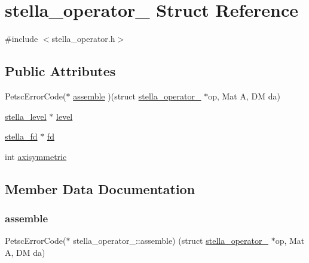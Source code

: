 \hypertarget{structstella__operator__}{}\section{stella\+\_\+operator\+\_\+ Struct Reference}
\label{structstella__operator__}


{\ttfamily \#include $<$stella\+\_\+operator.\+h$>$}

\subsection*{Public Attributes}
\begin{DoxyCompactItemize}
\item 
Petsc\+Error\+Code($\ast$ \mbox{\hyperlink{structstella__operator___ab943e5745cc7e69b823048738df22fbe}{assemble}} )(struct \mbox{\hyperlink{structstella__operator__}{stella\+\_\+operator\+\_\+}} $\ast$op, Mat A, DM da)
\item 
\mbox{\hyperlink{structstella__level}{stella\+\_\+level}} $\ast$ \mbox{\hyperlink{structstella__operator___a9077be12bc3bd23a0a06d617a010713f}{level}}
\item 
\mbox{\hyperlink{structstella__fd}{stella\+\_\+fd}} $\ast$ \mbox{\hyperlink{structstella__operator___ac5bf43c57b59a89df8b96a233c3978cc}{fd}}
\item 
int \mbox{\hyperlink{structstella__operator___a736dfc67cd63872aac66d5a227ef6d16}{axisymmetric}}
\end{DoxyCompactItemize}


\subsection{Member Data Documentation}
\mbox{\label{structstella__operator___ab943e5745cc7e69b823048738df22fbe}} 
\subsubsection{\texorpdfstring{assemble}{assemble}}
{\footnotesize\ttfamily Petsc\+Error\+Code($\ast$ stella\+\_\+operator\+\_\+\+::assemble) (struct \mbox{\hyperlink{structstella__operator__}{stella\+\_\+operator\+\_\+}} $\ast$op, Mat A, DM da)}

